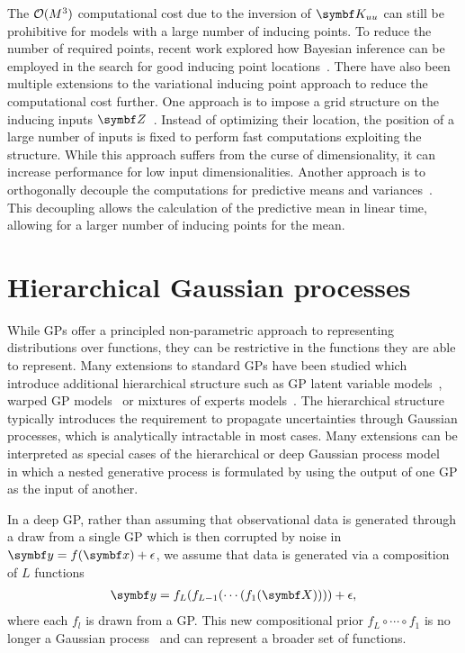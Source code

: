 The $\operatorname{\mathcal{O}}(M^3)$ computational cost due to the inversion of $\mat{K_{uu}}$ can still be prohibitive for models with a large number of inducing points.
To reduce the number of required points, recent work explored how Bayesian inference can be employed in the search for good inducing point locations~\parencite{hensman_mcmc_2015,rossi_rethinking_2020}.
There have also been multiple extensions to the variational inducing point approach to reduce the computational cost further.
One approach is to impose a grid structure on the inducing inputs $\mat{Z}$~\parencite{wilson_kernel_2015}.
Instead of optimizing their location, the position of a large number of inputs is fixed to perform fast computations exploiting the structure.
While this approach suffers from the curse of dimensionality, it can increase performance for low input dimensionalities.
Another approach is to orthogonally decouple the computations for predictive means and variances~\parencite{shi_sparse_2020,salimbeni_orthogonally_2018,cheng_variational_2017}.
This decoupling allows the calculation of the predictive mean in linear time, allowing for a larger number of inducing points for the mean.


\section{Hierarchical Gaussian processes}
\label{toc:dgp}
While GPs offer a principled non-parametric approach to representing distributions over functions, they can be restrictive in the functions they are able to represent.
Many extensions to standard GPs have been studied which introduce additional hierarchical structure such as GP latent variable models~\parencite{titsias_bayesian_2010,damianou_variational_2014}, warped GP models~\parencite{snelson_warped_2004,lazaro-gredilla_bayesian_2012} or mixtures of experts models~\parencite{tresp_mixtures_2001,rasmussen_infinite_2002,lazaro-gredilla_overlapping_2012}.
The hierarchical structure typically introduces the requirement to propagate uncertainties through Gaussian processes, which is analytically intractable in most cases.
Many extensions can be interpreted as special cases of the hierarchical or deep Gaussian process model~\parencite{lawrence_hierarchical_2007,damianou_deep_2013} in which a nested generative process is formulated by using the output of one GP as the input of another.

In a deep GP, rather than assuming that observational data is generated through a draw from a single GP which is then corrupted by noise in $\mat{y} = f(\mat{x}) + \epsilon$, we assume that data is generated via a composition of $L$ functions
\begin{equation}
    \begin{split}
        \mat{y} = f_L(f_{L-1}(\cdots(f_1(\mat{X})))) + \epsilon,
    \end{split}
\end{equation}
where each $f_l$ is drawn from a GP.
This new compositional prior $f_L \circ \cdots \circ f_1$ is no longer a Gaussian process~\parencite{duvenaud_avoiding_2014} and can represent a broader set of functions.

